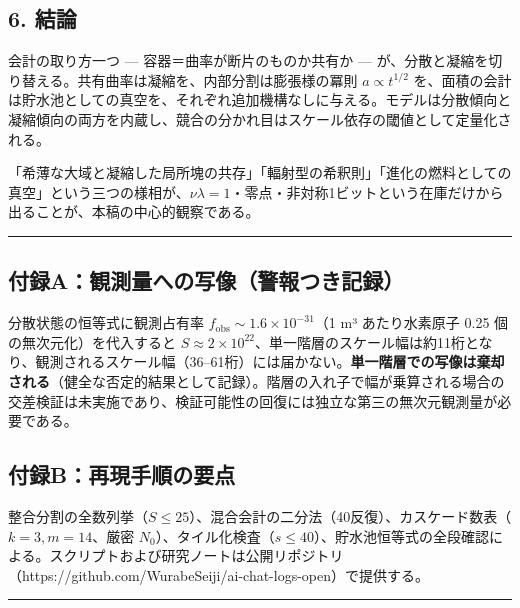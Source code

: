 \documentclass[
]{ltjsarticle}
\begin{document}
\subsection{6. 結論}\label{ux7d50ux8ad6}

会計の取り方一つ --- 容器＝曲率が断片のものか共有か ---
が、分散と凝縮を切り替える。共有曲率は凝縮を、内部分割は膨張様の冪則
\(a\propto t^{1/2}\)
を、面積の会計は貯水池としての真空を、それぞれ追加機構なしに与える。モデルは分散傾向と凝縮傾向の両方を内蔵し、競合の分かれ目はスケール依存の閾値として定量化される。

「希薄な大域と凝縮した局所塊の共存」「輻射型の希釈則」「進化の燃料としての真空」という三つの様相が、\(\nu\lambda=1\)・零点・非対称1ビットという在庫だけから出ることが、本稿の中心的観察である。

\begin{center}\rule{0.5\linewidth}{0.5pt}\end{center}

\subsection{付録A：観測量への写像（警報つき記録）}\label{ux4ed8ux9332aux89b3ux6e2cux91cfux3078ux306eux5199ux50cfux8b66ux5831ux3064ux304dux8a18ux9332}

分散状態の恒等式に観測占有率
\(f_{\mathrm{obs}}\sim1.6\times10^{-31}\)（1 m³ あたり水素原子 0.25
個の無次元化）を代入すると
\(S\approx2\times10^{22}\)、単一階層のスケール幅は約11桁となり、観測されるスケール幅（36--61桁）には届かない。\textbf{単一階層での写像は棄却される}（健全な否定的結果として記録）。階層の入れ子で幅が乗算される場合の交差検証は未実施であり、検証可能性の回復には独立な第三の無次元観測量が必要である。

\subsection{付録B：再現手順の要点}\label{ux4ed8ux9332bux518dux73feux624bux9806ux306eux8981ux70b9}

整合分割の全数列挙（\(S\le25\)）、混合会計の二分法（40反復）、カスケード数表（\(k=3,m=14\)、厳密
\(N_0\)）、タイル化検査（\(s\le40\)）、貯水池恒等式の全段確認による。スクリプトおよび研究ノートは公開リポジトリ（https://github.com/WurabeSeiji/ai-chat-logs-open）で提供する。

\begin{center}\rule{0.5\linewidth}{0.5pt}\end{center}
\end{document}
